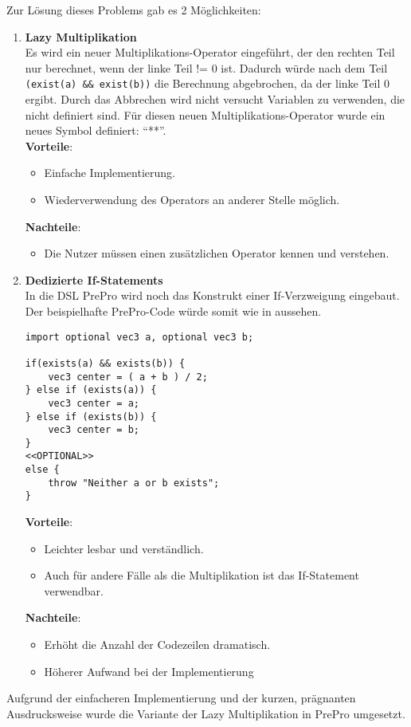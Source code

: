 Zur Lösung dieses Problems gab es 2 Möglichkeiten:
\begin{enumerate}
\item \textbf{Lazy Multiplikation}\\
Es wird ein neuer Multiplikations-Operator eingeführt, der den rechten Teil nur berechnet, wenn der linke Teil != 0 ist.
Dadurch würde nach dem Teil \texttt{(exist(a) \&\& exist(b))} die Berechnung abgebrochen, da der linke Teil 0 ergibt.
Durch das Abbrechen wird nicht versucht Variablen zu verwenden, die nicht definiert sind.
Für diesen neuen Multiplikations-Operator wurde ein neues Symbol definiert: ``**''.\\
\textbf{Vorteile}:
\begin{itemize}
\item Einfache Implementierung.
\item Wiederverwendung des Operators an anderer Stelle möglich.
\end{itemize}
\textbf{Nachteile}:
\begin{itemize}
\item Die Nutzer müssen einen zusätzlichen Operator kennen und verstehen.
\end{itemize}

\item \textbf{Dedizierte If-Statements}\\
In die \ac{DSL} PrePro wird noch das Konstrukt einer If-Verzweigung eingebaut.
Der beispielhafte PrePro-Code würde somit wie in  aussehen.
\begin{lstlisting}[language=prepro, label={lst:OptionalImportExample_If}, caption={PrePro-Code mit If-Statements und der exists-Funktion}, captionpos=b]
import optional vec3 a, optional vec3 b;

if(exists(a) && exists(b)) {
    vec3 center = ( a + b ) / 2;
} else if (exists(a)) {
    vec3 center = a;
} else if (exists(b)) {
    vec3 center = b;
}
<<OPTIONAL>>
else {
	throw "Neither a or b exists";
}
\end{lstlisting}
\textbf{Vorteile}:
\begin{itemize}
\item Leichter lesbar und verständlich.
\item Auch für andere Fälle als die Multiplikation ist das If-Statement verwendbar.
\end{itemize}
\textbf{Nachteile}:
\begin{itemize}
\item Erhöht die Anzahl der Codezeilen dramatisch.
\item Höherer Aufwand bei der Implementierung
\end{itemize}
\end{enumerate}
Aufgrund der einfacheren Implementierung und der kurzen, prägnanten Ausdrucksweise wurde die Variante der Lazy Multiplikation in PrePro umgesetzt.

